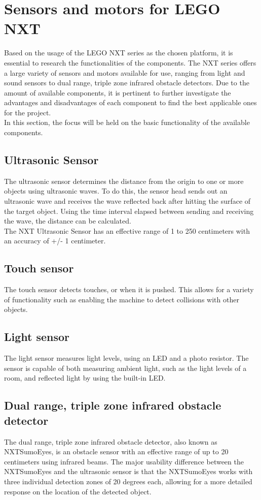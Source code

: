 \section{Sensors and motors for LEGO NXT}
\label{sec:sensors}
Based on the usage of the LEGO NXT series as the chosen platform, it is essential to research the functionalities of the components. 
The NXT series offers a large variety of sensors and motors available for use, ranging from light and sound sensors to dual range, triple zone infrared obstacle detectors.
Due to the amount of available components, it is pertinent to further investigate the advantages and disadvantages of each component to find the best applicable ones for the project.\\
In this section, the focus will be held on the basic functionality of the available components.

\subsection*{Ultrasonic Sensor}
The ultrasonic sensor determines the distance from the origin to one or more objects using ultrasonic waves.
To do this, the sensor head sends out an ultrasonic wave and receives the wave reflected back after hitting the surface of the target object.
Using the time interval elapsed between sending and receiving the wave, the distance can be calculated.\\
The NXT Ultrasonic Sensor has an effective range of 1 to 250 centimeters with an accuracy of +/- 1 centimeter.

\subsection*{Touch sensor}
The touch sensor detects touches, or when it is pushed.
This allows for a variety of functionality such as enabling the machine to detect collisions with other objects.

\subsection*{Light sensor}
The light sensor measures light levels, using an LED and a photo resistor.
The sensor is capable of both measuring ambient light, such as the light levels of a room, and reflected light by using the built-in LED.

\subsection*{Dual range, triple zone infrared obstacle detector}
The dual range, triple zone infrared obstacle detector, also known as NXTSumoEyes, is an obstacle sensor with an effective range of up to 20 centimeters using infrared beams.
The major usability difference between the NXTSumoEyes and the ultrasonic sensor is that the NXTSumoEyes works with three individual detection zones of 20 degrees each, allowing for a more detailed response on the location of the detected object.

